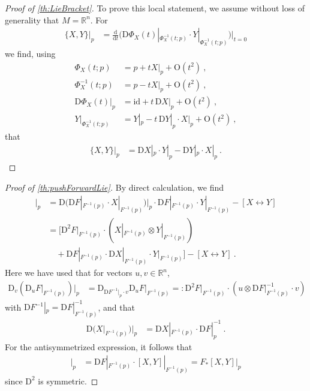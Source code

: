 \documentclass[10pt,a4paper]{article}
\theoremstyle{mytheorem}
\theoremstyle{mydefinition}
\newcommand{\dt}{\mathrm{d}}
\newcommand{\Dt}{\mathrm{D}}
\begin{document}
\begin{proof}[Proof of \ref{th:LieBracket}]
To prove this local statement, we assume without loss of generality that $M=\mathbb{R}^n$.
For
\begin{align*}
	\{X, Y\}\big|_{p}
	&=
	\frac{\dt}{\dt t}
	\Big(
		\Dt\Phi_X(t)|_{\Phi_X^{-1}(t; p)}
		\cdot
		Y|_{\Phi_X^{-1}(t; p)}
	\Big)\Big|_{t=0}
\end{align*}
we find, using
\begin{align*}
	\Phi_X(t; p)
	&= p + t X|_{p} + \mathrm{O}(t^2)
	\ ,\nonumber\\
	\Phi_X^{-1}(t; p)
	&= p - t X|_{p} + \mathrm{O}(t^2)
	\ ,\nonumber\\
	\Dt\Phi_X(t)\big|_{p}
	&= \mathrm{id} + t\,\Dt X|_{p} + \mathrm{O}(t^2)
	\ ,\nonumber\\
	Y|_{\Phi_X^{-1}(t; p)}
	&= Y|_{p} - t\,\Dt Y|_{p}\cdot X|_{p} + \mathrm{O}(t^2)
	\ ,
\end{align*}
that
\begin{align*}
	\{X, Y\}\big|_{p}
	&=
	\Dt X|_{p}
	\cdot
	Y|_{p}
	-
	\Dt Y|_{p}
	\cdot
	X|_{p}
	\ .
\end{align*}
\end{proof}

\begin{proof}[Proof of \ref{th:pushForwardLie}]
By direct calculation, we find
\begin{align*}
	[F_*X, F_*Y]\big|_{p}
	&= 
	\Dt \big(
		\Dt F|_{F^{-1}(p)} \cdot X|_{F^{-1}(p)}
	\big)\big|_p
	\cdot
	\Dt F|_{F^{-1}(p)} \cdot Y|_{F^{-1}(p)}
	- [X\leftrightarrow Y]
	\nonumber\\
	&=
	\big[
		\Dt^2F|_{F^{-1}(p)}
		\cdot
		(X|_{F^{-1}(p)}\otimes Y|_{F^{-1}(p)})
		\nonumber\\
		&\quad 
		+
		\Dt F|_{F^{-1}(p)} 
		\cdot \Dt X|_{F^{-1}(p)}
		\cdot Y|_{F^{-1}(p)}
	\big]
	- [X\leftrightarrow Y]
	\ .
\end{align*}
Here we have used that for vectors $u,v\in\mathbb{R}^n$,
\begin{align*}
	\Dt_v(\Dt_u F|_{F^{-1}(p)})\big|_p
	&=
	\Dt_{\Dt F^{-1}|_p\cdot v}
	\Dt_u F\big|_{F^{-1}(p)}
	=:
	\Dt^2F|_{F^{-1}(p)}\cdot(u \otimes \Dt F|_{F^{-1}(p)}^{-1}\cdot v)
\end{align*}
with $\Dt F^{-1}|_p=\Dt F|_{F^{-1}(p)}^{-1}$, and that
\begin{align*}
	\Dt \big(
		X|_{F^{-1}(p)}
	\big)\big|_p
	&=
	\Dt X|_{F^{-1}(p)}
	\cdot \Dt F|_{p}^{-1}
	\ .
\end{align*}
For the antisymmetrized expression, it follows that
\begin{align*}
	[F_*X, F_*Y]\big|_{p}
	&= \Dt F|_{F^{-1}(p)}
	\cdot
	[X, Y]|_{F^{-1}(p)}
	= F_*[X, Y]|_p
\end{align*}
since $\Dt^2$ is symmetric.
\end{proof}
\end{document}
